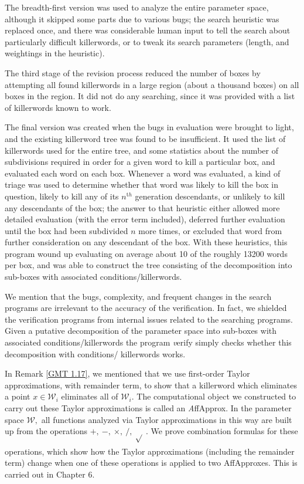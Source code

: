 \begin{remark}
\begin{remark}
The breadth-first version was used to analyze the entire parameter 
space, although it skipped some parts due to various bugs; the search 
heuristic was replaced once, and there was considerable human input 
to tell the search about particularly difficult killerwords, or to tweak 
its search parameters (length, and weightings in the heuristic).

The third stage of the revision process reduced the number of boxes by attempting all found 
killerwords in a large region (about a thousand boxes) on all boxes 
in the region.  It did not  do any searching, since it was provided with a 
list of killerwords known to work.

The final version was created when the bugs in evaluation were 
brought to light, and the existing killerword tree was found to be insufficient.  
It used the list of killerwords used for the entire tree, and some 
statistics about the number of subdivisions required in order for a 
given word to kill a particular box, and evaluated each word on each box.  Whenever 
a word was evaluated, a kind of triage was used to determine 
whether that word was likely to kill the box in question, likely to kill 
any of its $n^{\mathrm th}$ generation descendants, or unlikely to kill any 
descendants of the box; the answer to that heuristic either allowed more 
detailed evaluation (with the error term included), deferred further 
evaluation until the box had been subdivided $n$ more times, or 
excluded that word from further consideration on any descendant of 
the box.  With these heuristics, this program wound up evaluating on 
average about 10 of the roughly 13200 words per box, and was able to 
construct the tree consisting of the decomposition into sub-boxes with associated conditions/killerwords.

We mention that the bugs, complexity, and 
frequent changes in the search programs are irrelevant to the 
accuracy of the verification.  In fact, we shielded the verification 
programs from internal issues related to the searching programs.  
Given a putative decomposition of the parameter space into 
sub-boxes with associated conditions/killerwords the program {\textit verify} 
simply checks whether this decomposition with conditions/ 
killerwords works. 
\end{remark}

\begin{preview}\label{GMT 1.35}
	In Remark \ref{GMT 1.17}, we mentioned that we use first-order Taylor approximations, with remainder term, to show that
a killerword which eliminates a point $x\in {\mathcal W}_i$ eliminates all of ${\mathcal W}_i.$  
The computational object we constructed to carry out these Taylor approximations is called an {\textit AffApprox}.
In the parameter space ${\mathcal W},$ all functions analyzed via Taylor
approximations in this way are built up from the
operations $ +,\ -,\ \times, \  /,\ \sqrt{}_{\phantom{|}} .$  We prove combination
formulas for these operations, which show how the Taylor approximations
(including the remainder term) change when one of these operations is
applied to two AffApproxes.   This is carried out in Chapter 6. 


\end{preview}
\end{remark}
